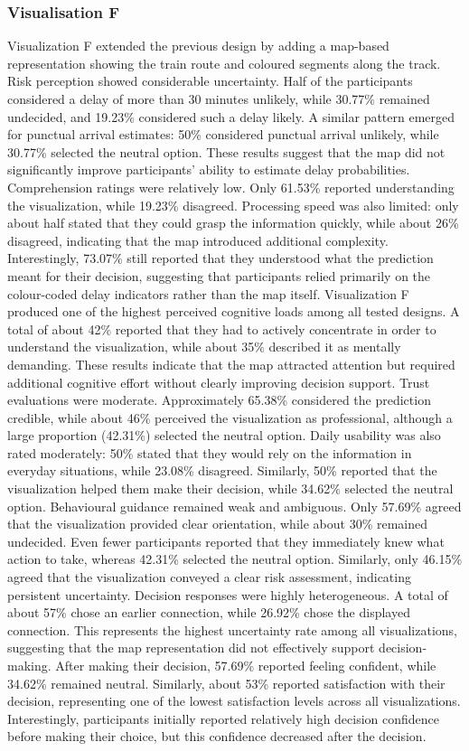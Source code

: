\documentclass[final,journal,a4paper]{IEEEtran}
\begin{document}
\subsubsection{Visualisation F}
Visualization F extended the previous design by adding a map-based representation showing the train route and coloured segments along the track. Risk perception showed considerable uncertainty. Half of the participants considered a delay of more than 30 minutes unlikely, while 30.77\% remained undecided, and 19.23\% considered such a delay likely. A similar pattern emerged for punctual arrival estimates: 50\% considered punctual arrival unlikely, while 30.77\% selected the neutral option. These results suggest that the map did not significantly improve participants’ ability to estimate delay probabilities. Comprehension ratings were relatively low. Only 61.53\% reported understanding the visualization, while 19.23\% disagreed. Processing speed was also limited: only about half stated that they could grasp the information quickly, while about 26\% disagreed, indicating that the map introduced additional complexity. Interestingly, 73.07\% still reported that they understood what the prediction meant for their decision, suggesting that participants relied primarily on the colour-coded delay indicators rather than the map itself. Visualization F produced one of the highest perceived cognitive loads among all tested designs. A total of about 42\% reported that they had to actively concentrate in order to understand the visualization, while about 35\% described it as mentally demanding. These results indicate that the map attracted attention but required additional cognitive effort without clearly improving decision support. Trust evaluations were moderate. Approximately 65.38\% considered the prediction credible, while about 46\% perceived the visualization as professional, although a large proportion (42.31\%) selected the neutral option. Daily usability was also rated moderately: 50\% stated that they would rely on the information in everyday situations, while 23.08\% disagreed. Similarly, 50\% reported that the visualization helped them make their decision, while 34.62\% selected the neutral option. Behavioural guidance remained weak and ambiguous. Only 57.69\% agreed that the visualization provided clear orientation, while about 30\% remained undecided. Even fewer participants reported that they immediately knew what action to take, whereas 42.31\% selected the neutral option. Similarly, only 46.15\% agreed that the visualization conveyed a clear risk assessment, indicating persistent uncertainty. Decision responses were highly heterogeneous. A total of about 57\% chose an earlier connection, while 26.92\% chose the displayed connection. This represents the highest uncertainty rate among all visualizations, suggesting that the map representation did not effectively support decision-making. After making their decision, 57.69\% reported feeling confident, while 34.62\% remained neutral. Similarly, about 53\% reported satisfaction with their decision, representing one of the lowest satisfaction levels across all visualizations. Interestingly, participants initially reported relatively high decision confidence before making their choice, but this confidence decreased after the decision.
\end{document}
